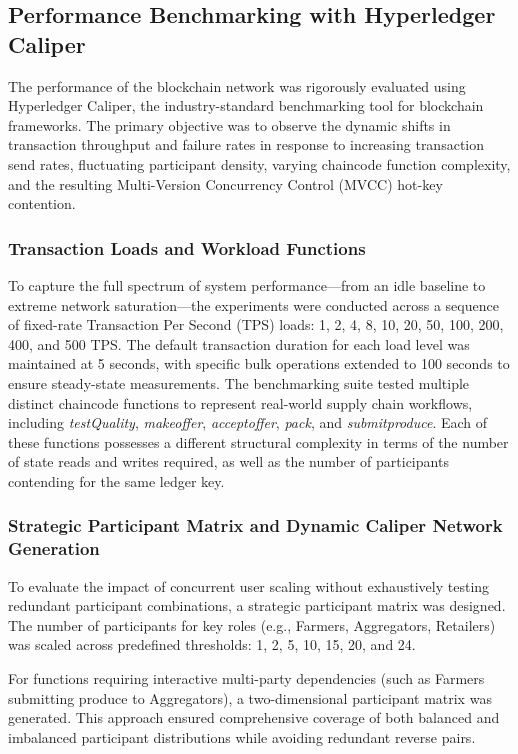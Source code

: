 \documentclass[manuscript,screen]{acmart}
\begin{document}
\subsection{Performance Benchmarking with Hyperledger Caliper}

The performance of the blockchain network was rigorously evaluated using Hyperledger Caliper, the industry-standard benchmarking tool for blockchain frameworks. The primary objective was to observe the dynamic shifts in transaction throughput and failure rates in response to increasing transaction send rates, fluctuating participant density, varying chaincode function complexity, and the resulting Multi-Version Concurrency Control (MVCC) hot-key contention.

\subsubsection{Transaction Loads and Workload Functions}

To capture the full spectrum of system performance—from an idle baseline to extreme network saturation—the experiments were conducted across a sequence of fixed-rate Transaction Per Second (TPS) loads: 1, 2, 4, 8, 10, 20, 50, 100, 200, 400, and 500 TPS. The default transaction duration for each load level was maintained at 5 seconds, with specific bulk operations extended to 100 seconds to ensure steady-state measurements. The benchmarking suite tested multiple distinct chaincode functions to represent real-world supply chain workflows, including \textit{testQuality}, \textit{makeoffer}, \textit{acceptoffer}, \textit{pack}, and \textit{submitproduce}. Each of these functions possesses a different structural complexity in terms of the number of state reads and writes required, as well as the number of participants contending for the same ledger key.

\subsubsection{Strategic Participant Matrix and Dynamic Caliper Network Generation}

To evaluate the impact of concurrent user scaling without exhaustively testing redundant participant combinations, a strategic participant matrix was designed. The number of participants for key roles (e.g., Farmers, Aggregators, Retailers) was scaled across predefined thresholds: 1, 2, 5, 10, 15, 20, and 24. 

For functions requiring interactive multi-party dependencies (such as Farmers submitting produce to Aggregators), a two-dimensional participant matrix was generated. This approach ensured comprehensive coverage of both balanced and imbalanced participant distributions while avoiding redundant reverse pairs.
\end{document}
